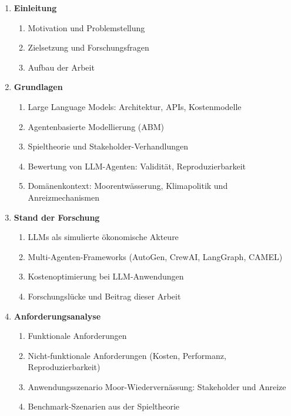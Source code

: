 \documentclass[12pt, a4paper]{article}
\begin{document}
\begin{enumerate}
    \item \textbf{Einleitung}
    \begin{enumerate}[label=\arabic{enumi}.\arabic*]
        \item Motivation und Problemstellung
        \item Zielsetzung und Forschungsfragen
        \item Aufbau der Arbeit
    \end{enumerate}

    \item \textbf{Grundlagen}
    \begin{enumerate}[label=\arabic{enumi}.\arabic*]
        \item Large Language Models: Architektur, APIs, Kostenmodelle
        \item Agentenbasierte Modellierung (ABM)
        \item Spieltheorie und Stakeholder-Verhandlungen
        \item Bewertung von LLM-Agenten: Validität, Reproduzierbarkeit
        \item Domänenkontext: Moorentwässerung, Klimapolitik und Anreizmechanismen
    \end{enumerate}

    \item \textbf{Stand der Forschung}
    \begin{enumerate}[label=\arabic{enumi}.\arabic*]
        \item LLMs als simulierte ökonomische Akteure
        \item Multi-Agenten-Frameworks (AutoGen, CrewAI, LangGraph, CAMEL)
        \item Kostenoptimierung bei LLM-Anwendungen
        \item Forschungslücke und Beitrag dieser Arbeit
    \end{enumerate}

    \item \textbf{Anforderungsanalyse}
    \begin{enumerate}[label=\arabic{enumi}.\arabic*]
        \item Funktionale Anforderungen
        \item Nicht-funktionale Anforderungen (Kosten, Performanz, Reproduzierbarkeit)
        \item Anwendungsszenario Moor-Wiedervernässung: Stakeholder und Anreize
        \item Benchmark-Szenarien aus der Spieltheorie
    \end{enumerate}


\end{enumerate}
\end{document}
